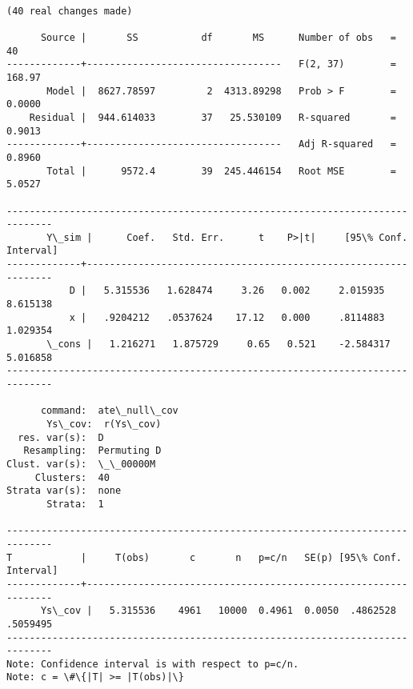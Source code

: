 \documentclass[11pt]{article}
\begin{document}
    \begin{Verbatim}[commandchars=\\\{\}]

(40 real changes made)

      Source |       SS           df       MS      Number of obs   =        40
-------------+----------------------------------   F(2, 37)        =    168.97
       Model |  8627.78597         2  4313.89298   Prob > F        =    0.0000
    Residual |  944.614033        37   25.530109   R-squared       =    0.9013
-------------+----------------------------------   Adj R-squared   =    0.8960
       Total |      9572.4        39  245.446154   Root MSE        =    5.0527

------------------------------------------------------------------------------
       Y\_sim |      Coef.   Std. Err.      t    P>|t|     [95\% Conf. Interval]
-------------+----------------------------------------------------------------
           D |   5.315536   1.628474     3.26   0.002     2.015935    8.615138
           x |   .9204212   .0537624    17.12   0.000     .8114883    1.029354
       \_cons |   1.216271   1.875729     0.65   0.521    -2.584317    5.016858
------------------------------------------------------------------------------

      command:  ate\_null\_cov
       Ys\_cov:  r(Ys\_cov)
  res. var(s):  D
   Resampling:  Permuting D
Clust. var(s):  \_\_00000M
     Clusters:  40
Strata var(s):  none
       Strata:  1

------------------------------------------------------------------------------
T            |     T(obs)       c       n   p=c/n   SE(p) [95\% Conf. Interval]
-------------+----------------------------------------------------------------
      Ys\_cov |   5.315536    4961   10000  0.4961  0.0050  .4862528   .5059495
------------------------------------------------------------------------------
Note: Confidence interval is with respect to p=c/n.
Note: c = \#\{|T| >= |T(obs)|\}

    \end{Verbatim}
\end{document}
